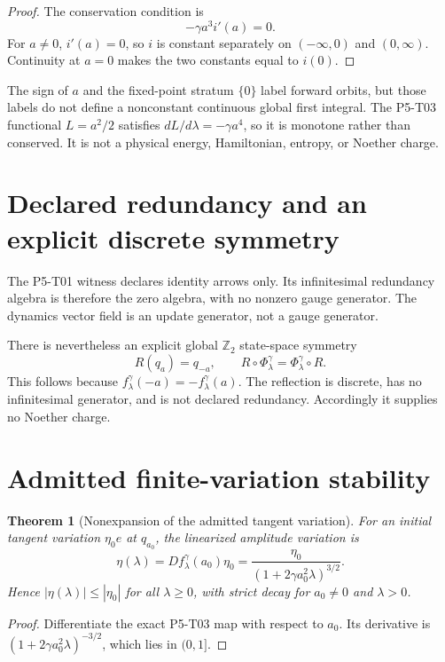 \documentclass[11pt]{article}
\newtheorem{theorem}{Theorem}
\begin{document}
\begin{proof}
The conservation condition is
\[
 -\gamma a^3 i'(a)=0.
\]
For \(a\neq0\), \(i'(a)=0\), so \(i\) is constant separately on
\((-\infty,0)\) and \((0,\infty)\).  Continuity at \(a=0\) makes the two
constants equal to \(i(0)\).
\end{proof}

The sign of \(a\) and the fixed-point stratum \(\{0\}\) label forward orbits,
but those labels do not define a nonconstant continuous global first
integral.  The P5-T03 functional \(L=a^2/2\) satisfies
\(dL/d\lambda=-\gamma a^4\), so it is monotone rather than conserved.  It is
not a physical energy, Hamiltonian, entropy, or Noether charge.

\section{Declared redundancy and an explicit discrete symmetry}

The P5-T01 witness declares identity arrows only.  Its infinitesimal
redundancy algebra is therefore the zero algebra, with no nonzero gauge
generator.  The dynamics vector field is an update generator, not a gauge
generator.

There is nevertheless an explicit global \(\mathbb Z_2\) state-space
symmetry
\[
 R(q_a)=q_{-a},\qquad
 R\circ\Phi^\gamma_\lambda
 =\Phi^\gamma_\lambda\circ R.
\]
This follows because \(f^\gamma_\lambda(-a)=-f^\gamma_\lambda(a)\).
The reflection is discrete, has no infinitesimal generator, and is not
declared redundancy.  Accordingly it supplies no Noether charge.

\section{Admitted finite-variation stability}

\begin{theorem}[Nonexpansion of the admitted tangent variation]
\label{thm:variation}
For an initial tangent variation \(\eta_0e\) at \(q_{a_0}\), the linearized
amplitude variation is
\[
 \eta(\lambda)
 =D f^\gamma_\lambda(a_0)\eta_0
 =\frac{\eta_0}
 {(1+2\gamma a_0^2\lambda)^{3/2}}.
\]
Hence \(|\eta(\lambda)|\leq|\eta_0|\) for all \(\lambda\geq0\), with strict
decay for \(a_0\neq0\) and \(\lambda>0\).
\end{theorem}

\begin{proof}
Differentiate the exact P5-T03 map with respect to \(a_0\).  Its derivative
is \((1+2\gamma a_0^2\lambda)^{-3/2}\), which lies in \((0,1]\).
\end{proof}
\end{document}
